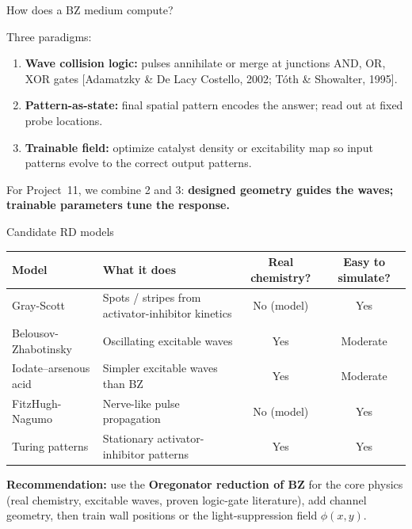 \documentclass[aspectratio=169,11pt]{beamer}
\newcommand{\citeslide}[1]{\hfill{\footnotesize [#1]}}
\begin{document}
\begin{frame}{How does a BZ medium compute?}

Three paradigms:

\vspace{0.3cm}
\begin{enumerate}
    \item \textbf{Wave collision logic:} pulses annihilate or merge at junctions \textrightarrow{} AND, OR, XOR gates \citeslide{Adamatzky \& De Lacy Costello, 2002; T\'oth \& Showalter, 1995}.
    \item \textbf{Pattern-as-state:} final spatial pattern encodes the answer; read out at fixed probe locations.
    \item \textbf{Trainable field:} optimize catalyst density or excitability map so input patterns evolve to the correct output patterns.
\end{enumerate}

\vspace{0.3cm}
For Project~11, we combine 2 and 3: \textbf{designed geometry guides the waves; trainable parameters tune the response.}

\end{frame}

\begin{frame}{Candidate RD models}

\begin{table}
\centering
\footnotesize
\begin{tabular}{p{2.8cm}p{4.0cm}cc}
\toprule
\textbf{Model} & \textbf{What it does} & \textbf{Real chemistry?} & \textbf{Easy to simulate?} \\
\midrule
Gray-Scott & Spots / stripes from activator-inhibitor kinetics & No (model) & Yes \\
Belousov-Zhabotinsky & Oscillating excitable waves & Yes & Moderate \\
Iodate--arsenous acid & Simpler excitable waves than BZ & Yes & Moderate \\
FitzHugh-Nagumo & Nerve-like pulse propagation & No (model) & Yes \\
Turing patterns & Stationary activator-inhibitor patterns & Yes & Yes \\
\bottomrule
\end{tabular}
\end{table}

\vspace{0.3cm}
\textbf{Recommendation:} use the \textbf{Oregonator reduction of BZ} for the core physics (real chemistry, excitable waves, proven logic-gate literature), add channel geometry, then train wall positions or the light-suppression field $\phi(x,y)$.

\end{frame}
\end{document}
